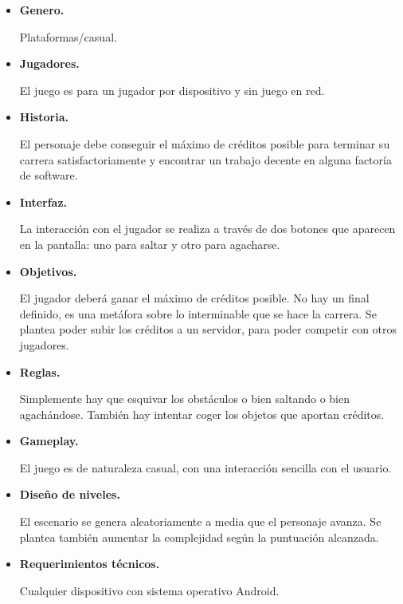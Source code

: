 \documentclass[12 pt, a4paper, twoside]{article}
\begin{document}
\begin{itemize}

  \item {\bf Genero.}

    Plataformas/casual.

  \item {\bf Jugadores.}

    El juego es para un jugador por dispositivo y sin juego en red.

  \item {\bf Historia.}

    El personaje debe conseguir el máximo de créditos posible para terminar su
    carrera satisfactoriamente y encontrar un trabajo decente en alguna
    factoría de software.


  \item {\bf Interfaz.}

    La interacción con el jugador se realiza a través de dos botones que
    aparecen en la pantalla: uno para saltar y otro para agacharse.

  \item {\bf Objetivos.}

    El jugador deberá ganar el máximo de créditos posible. No hay un final
    definido, es una metáfora sobre lo interminable que se hace la carrera. Se
    plantea poder subir los créditos a un servidor, para poder competir con
    otros jugadores.

  \item {\bf Reglas.}

    Simplemente hay que esquivar los obstáculos o bien saltando o bien
    agachándose. También hay intentar coger los objetos que aportan créditos.


  \item {\bf Gameplay.}

    El juego es de naturaleza casual, con una interacción sencilla con el
    usuario.

  \item {\bf Diseño de niveles.}

    El escenario se genera aleatoriamente a media que el personaje avanza. Se
    plantea también aumentar la complejidad según la puntuación alcanzada.

  \item {\bf Requerimientos técnicos.}

    Cualquier dispositivo con sistema operativo Android.

\end{itemize}
\end{document}
